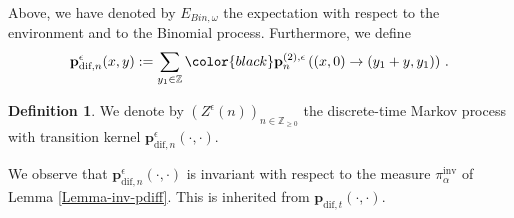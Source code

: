 \documentclass[a4paper,11pt,oneside,reqno]{amsart}
\theoremstyle{definition}
\newtheorem{definition}[theorem]{Definition}
\renewcommand{\geq}{\geqslant}
\numberwithin{equation}{section}
\begin{document}
Above, we have denoted by $E_{Bin,\omega}$ the expectation with respect to the environment and to the Binomial process. Furthermore, we define 
\begin{equation}\label{pdif-epsilon}
	\mathbf{p}_{\text{dif},n}^{\epsilon}(x,y):=\sum_{y_{1}\in\mathbb{Z}}{\color{black}\mathbf{p}^{(2),\epsilon}_{n}}\left((x,0)\to(y_{1}+y,y_{1})\right)\,.
\end{equation}
\begin{definition}\label{remark-Zn}
	We denote by $(Z^{\epsilon}(n))_{n\in \mathbb{Z}_{\geq 0}}$ the discrete-time Markov process with transition kernel $\mathbf{p}_{\text{dif},n}^{\epsilon}(\cdot,\cdot)$. 
\end{definition}
We observe that $\mathbf{p}_{\text{dif},n}^{\epsilon}(\cdot,\cdot)$ is invariant with respect to the measure $\pi^{\text{inv}}_{\alpha}$ of Lemma \ref{Lemma-inv-pdiff}. This is inherited from $\mathbf{p}_{\text{dif},t}(\cdot,\cdot)$. 
\end{document}
